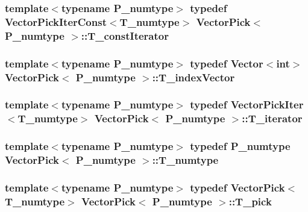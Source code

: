\subsubsection[{T\+\_\+const\+Iterator}]{\setlength{\rightskip}{0pt plus 5cm}template$<$typename P\+\_\+numtype$>$ typedef {\bf Vector\+Pick\+Iter\+Const}$<${\bf T\+\_\+numtype}$>$ {\bf Vector\+Pick}$<$ P\+\_\+numtype $>$\+::{\bf T\+\_\+const\+Iterator}}\label{classVectorPick_a5c6029ef4573adb719b497be94ce2a57}
\hypertarget{classVectorPick_aa9b24fd60f963a737fa946622c5e39a2}{}
\subsubsection[{T\+\_\+index\+Vector}]{\setlength{\rightskip}{0pt plus 5cm}template$<$typename P\+\_\+numtype$>$ typedef {\bf Vector}$<$int$>$ {\bf Vector\+Pick}$<$ P\+\_\+numtype $>$\+::{\bf T\+\_\+index\+Vector}}\label{classVectorPick_aa9b24fd60f963a737fa946622c5e39a2}
\hypertarget{classVectorPick_a8c1792384cedd1074814cc152aea9e72}{}
\subsubsection[{T\+\_\+iterator}]{\setlength{\rightskip}{0pt plus 5cm}template$<$typename P\+\_\+numtype$>$ typedef {\bf Vector\+Pick\+Iter}$<${\bf T\+\_\+numtype}$>$ {\bf Vector\+Pick}$<$ P\+\_\+numtype $>$\+::{\bf T\+\_\+iterator}}\label{classVectorPick_a8c1792384cedd1074814cc152aea9e72}
\hypertarget{classVectorPick_a8e830396ccfaea2b85a2a442f45fca35}{}
\subsubsection[{T\+\_\+numtype}]{\setlength{\rightskip}{0pt plus 5cm}template$<$typename P\+\_\+numtype$>$ typedef P\+\_\+numtype {\bf Vector\+Pick}$<$ P\+\_\+numtype $>$\+::{\bf T\+\_\+numtype}}\label{classVectorPick_a8e830396ccfaea2b85a2a442f45fca35}
\hypertarget{classVectorPick_ab257fd713ce0f2a81bc79059cec93ac9}{}
\subsubsection[{T\+\_\+pick}]{\setlength{\rightskip}{0pt plus 5cm}template$<$typename P\+\_\+numtype$>$ typedef {\bf Vector\+Pick}$<${\bf T\+\_\+numtype}$>$ {\bf Vector\+Pick}$<$ P\+\_\+numtype $>$\+::{\bf T\+\_\+pick}}\label{classVectorPick_ab257fd713ce0f2a81bc79059cec93ac9}
\hypertarget{classVectorPick_ad84fb47502945888eb8854b1460e493b}{}
